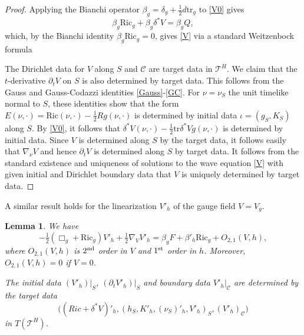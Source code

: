 \documentclass[10pt]{amsart}
\renewcommand{\b}{\beta}
\renewcommand{\d}{\delta}
\newcommand{\cC}{{\mathcal C}}
\newcommand{\cT}{{\mathcal T}}
\newcommand{\Ric}{\mathrm{Ric}}
\newcommand{\be}{\begin{equation}}
\newcommand{\ee}{\end{equation}}
\newcommand{\tr}{\mathrm{tr}}
\newcommand{\p}{\partial}
\newcommand{\<}{\langle}
\renewcommand{\>}{\rangle}
\theoremstyle{plain}
\newtheorem{lemma}{Lemma}[section]
\theoremstyle{remark}
\theoremstyle{definition}
\numberwithin{equation}{section}
\begin{document}
\begin{proof}
Applying the Bianchi operator $\b_g = \d_g + \frac{1}{2}d \tr_g$ to \eqref{V0} gives 
\be \label{V2}
\b_g \Ric_g + \b_g \d^*V = \b_g Q,
\ee
which, by the Bianchi identity $\b_g \Ric_g = 0$, gives \eqref{V} via a standard Weitzenbock formula 

The Dirichlet data for $V$ along $S$ and $\cC$ are target data in $\cT^H$. We claim that the $t$-derivative $\p_t V$ on $S$ is also 
determined by target data. This follows from the Gauss and Gauss-Codazzi identities \eqref{Gauss}-\eqref{GC}. For $\nu = \nu_S$ the 
unit timelike normal to $S$, these identities show that the form $E(\nu, \cdot) = \Ric(\nu, \cdot) - \frac{1}{2}R g(\nu, \cdot)$ is determined by 
initial data $\iota = (g_S, K_S)$ along $S$. By \eqref{V0}, it follows that $\d^*V(\nu, \cdot) - \frac{1}{2}\tr \d^*V g(\nu, \cdot)$ is determined by 
initial data. Since $V$ is determined along $S$ by the target data, it follows easily that $\nabla_{\nu}V$ and hence $\p_t V$ is determined 
along $S$ by target data. It follows from the standard existence and uniqueness of solutions to the wave equation \eqref{V} with given initial 
and Dirichlet boundary data that $V$ is uniquely determined by target data. 

\end{proof}

 A similar result holds for the linearization $V'_h$ of the gauge field $V = V_g$. 
\begin{lemma}\label{Gauge-lemma2}
We have 
\be \label{V'}
-\tfrac{1}{2}(\Box_g + \Ric_g)V'_h + \tfrac{1}{2}\nabla_V V'_h = \b_g F + \b'_h \Ric_g + O_{2,1}(V,h),
\ee
where $O_{2,1}(V,h)$ is $2^{\rm nd}$ order in $V$ and $1^{\rm st}$ order in $h$. Moreover, $O_{2,1}(V,h) = 0$ if $V = 0$. 

  The initial data $(V'_h)|_S$, $(\p_t V'_h)|_S$ and boundary data $V'_h|_{\cC}$ are determined by the target data  
$$\big((Ric + \d^*V)'_h, (h_S, K'_h, (\nu_S)'_h, V'_h)_S, (V'_h)_{\cC}\big)$$
in $T(\cT^H)$.
\end{lemma}
\end{document}
